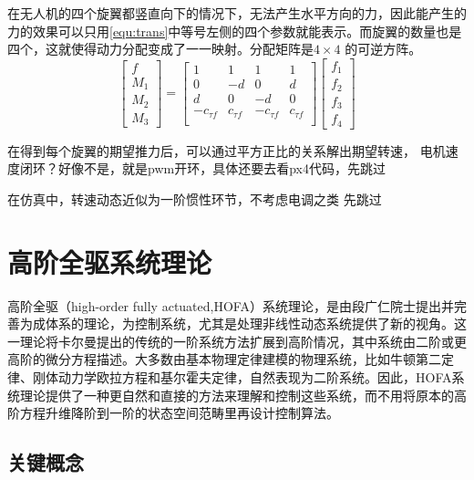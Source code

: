 在无人机的四个旋翼都竖直向下的情况下，无法产生水平方向的力，因此能产生的力的效果可以只用\ref{equ:trans}中等号左侧的四个参数就能表示。而旋翼的数量也是四个，这就使得动力分配变成了一一映射。分配矩阵是$4\times 4$ 的可逆方阵。
\begin{equation}
  \begin{bmatrix}
    f \\
    M_1 \\
     M_2\\M_3
    \end{bmatrix}=\begin{bmatrix}
    1 &1  & 1 & 1 \\
    0 & -d & 0 & d \\
    d & 0 & -d & 0 \\
    -c_{\tau f} & c_{\tau f} & -c_{\tau f} & c_{\tau f} \\
    \end{bmatrix}\begin{bmatrix}
     f_1\\
    f_2 \\
     f_3\\f_4
    \end{bmatrix}   
    \label{equ:trans}
\end{equation}

在得到每个旋翼的期望推力后，可以通过平方正比的关系解出期望转速，
电机速度闭环？好像不是，就是pwm开环，具体还要去看px4代码，先跳过

在仿真中，转速动态近似为一阶惯性环节，不考虑电调之类
先跳过



\section{高阶全驱系统理论}

高阶全驱（high-order fully actuated,HOFA）系统理论\cite{duan1}，是由段广仁院士提出并完善为成体系的理论，为控制系统，尤其是处理非线性动态系统提供了新的视角。这一理论将卡尔曼提出的传统的一阶系统方法扩展到高阶情况，其中系统由二阶或更高阶的微分方程描述。大多数由基本物理定律建模的物理系统，比如牛顿第二定律、刚体动力学欧拉方程和基尔霍夫定律，自然表现为二阶系统。因此，HOFA系统理论提供了一种更自然和直接的方法来理解和控制这些系统，而不用将原本的高阶方程升维降阶到一阶的状态空间范畴里再设计控制算法。

\subsection*{关键概念}

